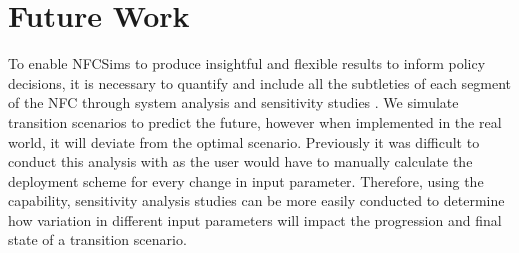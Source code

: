 \section{Future Work}
To enable NFCSims to produce insightful and flexible results
to inform policy decisions, it is necessary to
quantify and include all the subtleties of each segment of the NFC
through system analysis and sensitivity studies 
\cite{passerini_systematic_2014}. 
We simulate transition scenarios to predict the future, however 
when implemented in the real world, 
it will deviate from the optimal scenario.
Previously it was difficult to conduct this analysis with \Cyclus 
as the user would have to 
manually calculate the deployment scheme for every change in input 
parameter. 
Therefore, using the \deploy capability,
sensitivity analysis studies can be more easily 
conducted to determine how variation in different 
input parameters will impact the progression and final state of 
a transition scenario.